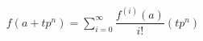 \documentclass[preview]{standalone}
\begin{document}
\begin{align*}
f(a+tp^n) = \sum_{i=0}^{\infty}\dfrac{f^{(i)}(a)}{i!}(tp^n)
\end{align*}
\end{document}
